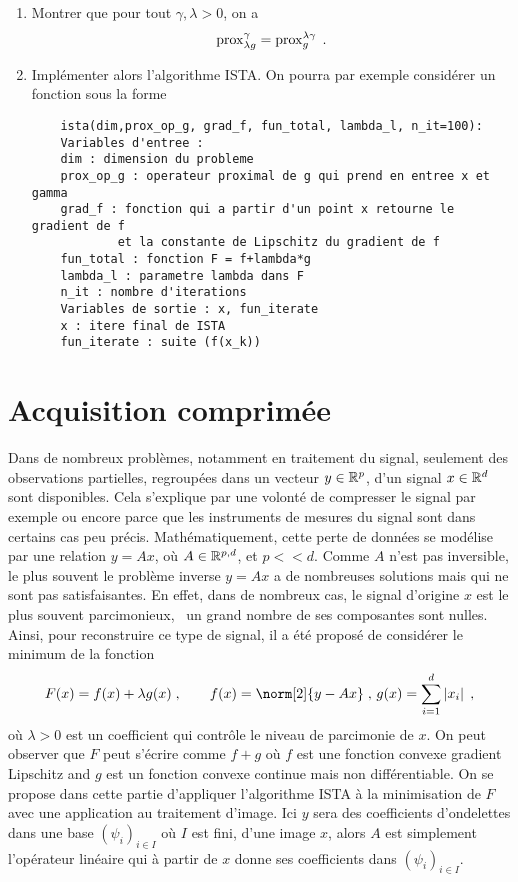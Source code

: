 \documentclass[a4paper,french,12pt]{article}
\begin{document}
\begin{enumerate}
\item Montrer que pour tout $\gamma, \lambda >0$, on a
  \begin{equation*}
    \operatorname{prox}_{\lambda g}^{\gamma} = \operatorname{prox}_{ g}^{\lambda \gamma} \;.
  \end{equation*}
\item Implémenter alors l'algorithme ISTA. On pourra par exemple considérer un fonction
  sous la forme
  \begin{lstlisting}
    ista(dim,prox_op_g, grad_f, fun_total, lambda_l, n_it=100):
    Variables d'entree :
    dim : dimension du probleme
    prox_op_g : operateur proximal de g qui prend en entree x et gamma
    grad_f : fonction qui a partir d'un point x retourne le gradient de f
            et la constante de Lipschitz du gradient de f
    fun_total : fonction F = f+lambda*g
    lambda_l : parametre lambda dans F
    n_it : nombre d'iterations
    Variables de sortie : x, fun_iterate
    x : itere final de ISTA
    fun_iterate : suite (f(x_k))
  \end{lstlisting}
\end{enumerate}

\section{Acquisition comprimée}
%
Dans de nombreux problèmes, notamment en traitement du signal,
seulement des observations partielles, regroupées dans un vecteur
$y \in \mathbb{R}^p$, d'un signal $x \in \mathbb{R}^d$ sont disponibles. Cela
s'explique par une volonté de compresser le signal par exemple ou
encore parce que les instruments de mesures du signal sont dans
certains cas peu précis. Mathématiquement, cette perte de données se
modélise par une relation $y=Ax$, où $A \in \mathbb{R}^{p,d}$, et $p <<
d$. Comme $A$ n'est pas inversible, le plus souvent le problème
inverse $y=Ax$ a de nombreuses solutions mais qui ne sont pas
satisfaisantes. En effet, dans de nombreux cas, le signal d'origine
$x$ est le plus souvent parcimonieux, \ie~un grand nombre de ses
composantes sont nulles. Ainsi, pour reconstruire ce type de signal,
il a été proposé de considérer le minimum de la fonction
\begin{equation*}
  F(x) = f(x) + \lambda g(x) \eqsp, \qquad f(x) = \norm[2]{y-Ax} \eqsp, \,  g(x) =  \sum_{i=1}^d \abs{x_i} \eqsp,
\end{equation*}
où $\lambda >0$ est un coefficient qui contrôle le niveau de
parcimonie de $x$.  On peut observer que $F$ peut s'écrire comme $f+g$
où $f$ est une fonction convexe gradient Lipschitz and $g$ est un
fonction convexe continue mais non différentiable. On se propose dans
cette partie d'appliquer l'algorithme ISTA à la minimisation de $F$
avec une application au traitement d'image. Ici $y$ sera des
coefficients d'ondelettes dans une base $(\psi_i)_{i \in I}$ où $I$
est fini, d'une image $x$, alors $A$ est simplement l'opérateur
linéaire qui à partir de $x$ donne ses coefficients dans
$(\psi_i)_{i \in I}$.
\end{document}

